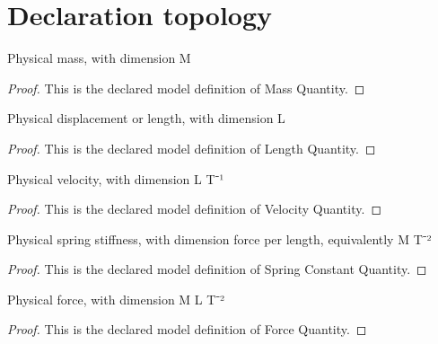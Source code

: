 \section{Declaration topology}
\begin{definition}
  \label{def:physics:phyx-mini-0226:phyxminiproblems-problemphyxmini0226-massquantity}
  Physical mass, with dimension M
\end{definition}
\begin{proof}
  This is the declared model definition of Mass Quantity.
\end{proof}
\begin{definition}
  \label{def:physics:phyx-mini-0226:phyxminiproblems-problemphyxmini0226-lengthquantity}
  Physical displacement or length, with dimension L
\end{definition}
\begin{proof}
  This is the declared model definition of Length Quantity.
\end{proof}
\begin{definition}
  \label{def:physics:phyx-mini-0226:phyxminiproblems-problemphyxmini0226-velocityquantity}
  Physical velocity, with dimension L T⁻¹
\end{definition}
\begin{proof}
  This is the declared model definition of Velocity Quantity.
\end{proof}
\begin{definition}
  \label{def:physics:phyx-mini-0226:phyxminiproblems-problemphyxmini0226-springconstantquantity}
  Physical spring stiffness, with dimension force per length, equivalently M T⁻²
\end{definition}
\begin{proof}
  This is the declared model definition of Spring Constant Quantity.
\end{proof}
\begin{definition}
  \label{def:physics:phyx-mini-0226:phyxminiproblems-problemphyxmini0226-forcequantity}
  Physical force, with dimension M L T⁻²
\end{definition}
\begin{proof}
  This is the declared model definition of Force Quantity.
\end{proof}
